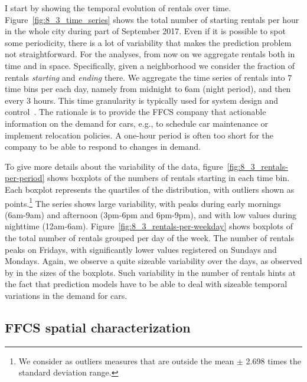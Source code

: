 I start by showing the temporal evolution of rentals over time. Figure~\ref{fig:8_3_time_series} shows the total number of starting rentals per hour in the whole city during part of September 2017. Even if it is possible to spot some periodicity, there is a lot of variability that makes the prediction problem not straightforward. 
For the analyses, from now on we aggregate rentals both in time and in space. Specifically, given a neighborhood we consider the fraction of rentals \textit{starting} and \textit{ending} there. We aggregate the time series of rentals into 7 time bins per each day, namely from midnight to 6am (night period), and then every 3 hours. 
This time granularity is typically used for system design and control~\citep{schmoller2015empirical}. The rationale is to provide the FFCS company that actionable information on the demand for cars, e.g., to schedule car maintenance or implement relocation policies. A one-hour period is often too short for the company to be able to respond to changes in demand.

To give more details about the variability of the data, figure~\ref{fig:8_3_rentals-per-period} shows boxplots of the  numbers of rentals starting in each time bin. Each boxplot represents the quartiles of the distribution, with outliers shown as points.\footnote{We consider as outliers measures that are outside the mean $\pm$ 2.698 times the standard deviation range.} 
The series shows large variability, with peaks during early mornings (6am-9am) and afternoon (3pm-6pm and 6pm-9pm), and with low values during nighttime (12am-6am). 
Figure~\ref{fig:8_3_rentals-per-weekday} shows boxplots of the total number of rentals grouped per day of the week. The number of rentals peaks on Fridays, with significantly lower values registered on Sundays and Mondays. 
Again, we observe a quite sizeable variability over the days, as observed by in the sizes of the boxplots. 
Such variability in the number of rentals hints at the fact that prediction models have to be able to deal with sizeable temporal variations in the demand for cars.

\subsection{FFCS spatial characterization}

